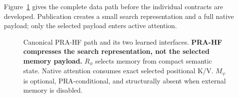 \documentclass[11pt]{article}
\begin{document}
Figure~\ref{fig:adapter} gives the complete data path before the individual contracts are
developed. Publication creates a small search representation and a full native payload; only the
selected payload enters active attention.

\begin{figure}[H]
\centering
{}
\caption{Canonical PRA-HF path and its two learned interfaces. \textbf{PRA-HF compresses the
search representation, not the selected memory payload.} $R_\phi$ selects memory from compact
semantic state. Native attention consumes exact selected positional K/V. $M_\psi$ is optional,
PRA-conditional, and structurally absent when external memory is disabled.}
\label{fig:adapter}
\end{figure}
\end{document}
